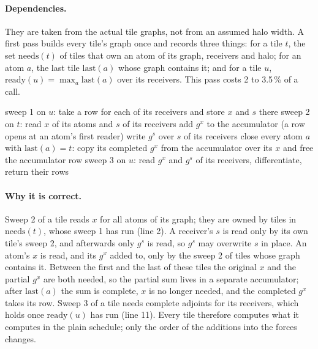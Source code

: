 \documentclass[11pt]{article}
\begin{document}
\paragraph{Dependencies.}
They are taken from the actual tile graphs, not from an assumed halo width. A first pass builds every tile's
graph once and records three things: for a tile $t$, the set $\mathrm{needs}(t)$ of tiles that own an atom of
its graph, receivers and halo; for an atom $a$, the last tile $\mathrm{last}(a)$ whose graph contains it; and for
a tile $u$, $\mathrm{ready}(u) = \max_a \mathrm{last}(a)$ over its receivers. This pass costs 2 to 3.5\,\% of a
call.

\begin{algorithm}[t]
\caption{Wavefront schedule over tiles $1,\dots,T$ in groups of $g = 16$ consecutive tiles.}
\label{alg:wavefront}
\begin{algorithmic}[1]
    \State sweep 1 on $u$: take a row for each of its receivers and store $x$ and $s$ there
  \EndFor
    \State sweep 2 on $t$: read $x$ of its atoms and $s$ of its receivers
    \State \hspace{1.5em} add $g^x$ to the accumulator (a row opens at an atom's first reader)
    \State \hspace{1.5em} write $g^s$ over $s$ of its receivers
    \State close every atom $a$ with $\mathrm{last}(a) = t$: copy its completed $g^x$ from the accumulator
    \Statex \hspace{3em} over its $x$ and free the accumulator row
  \EndFor
    \State sweep 3 on $u$: read $g^x$ and $g^s$ of its receivers, differentiate, return their rows
  \EndFor
\EndFor
\end{algorithmic}
\end{algorithm}

\paragraph{Why it is correct.}
Sweep 2 of a tile reads $x$ for all atoms of its graph; they are owned by tiles in $\mathrm{needs}(t)$, whose
sweep 1 has run (line 2). A receiver's $s$ is read only by its own tile's sweep 2, and afterwards only $g^s$ is
read, so $g^s$ may overwrite $s$ in place. An atom's $x$ is read, and its $g^x$ added to, only by the sweep 2 of
tiles whose graph contains it. Between the first and the last of these tiles the original $x$ and the partial
$g^x$ are both needed, so the partial sum lives in a separate accumulator; after $\mathrm{last}(a)$ the sum is
complete, $x$ is no longer needed, and the completed $g^x$ takes its row. Sweep 3 of a tile needs complete
adjoints for its receivers, which holds once $\mathrm{ready}(u)$ has run (line 11). Every tile therefore computes
what it computes in the plain schedule; only the order of the additions into the forces changes.
\end{document}
